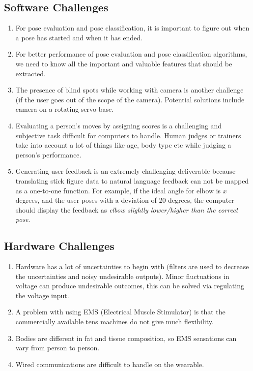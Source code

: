 \subsection{Software Challenges}
\begin{enumerate}
  \item For pose evaluation and pose classification, it is important to figure out when a pose has started and when it has ended. 
  
  \item For better performance of pose evaluation and pose classification algorithms, we need to know all the important and valuable features that should be extracted.
  
  \item The presence of blind spots while working with camera is another challenge (if the user goes out of the scope of the camera). Potential solutions include camera on a rotating servo base.
  
  \item Evaluating a person’s moves by assigning scores is a challenging and subjective task difficult for computers to handle. Human judges or trainers take into account a lot of things like age, body type etc while judging a person's performance. 
  
   \item Generating user feedback is an extremely challenging deliverable because translating stick figure data to natural language feedback can not be mapped as a one-to-one function. For example, if the ideal angle for elbow is \(x\) degrees, and the user poses with a deviation of 20 degrees, the computer should display the feedback as \textit{elbow slightly lower/higher than the correct pose}.
\end{enumerate}
\subsection{Hardware Challenges}
\begin{enumerate}
  \item Hardware has a lot of uncertainties to begin with (filters are used to decrease the uncertainties and noisy undesirable outputs). Minor fluctuations in voltage can produce undesirable outcomes, this can be solved via regulating the voltage input.
  
  \item A problem with using EMS (Electrical Muscle Stimulator) is that the commercially available tens machines do not give much flexibility. 
  
  \item Bodies are different in fat and tissue composition, so EMS sensations can vary from person to person.

  \item Wired communications are difficult to handle on the wearable.
  
\end{enumerate}
